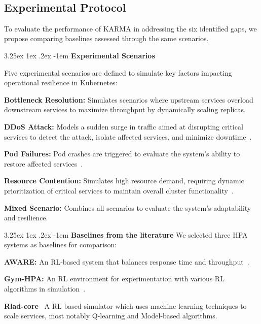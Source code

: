 \documentclass[conference]{IEEEtran}
\makeatletter
\renewcommand\paragraph{\@startsection{paragraph}{5}{\z@}%
  {3.25ex \@plus1ex \@minus.2ex}%
  {-1em}%
  {\normalfont\normalsize\bfseries}}
\makeatother
\begin{document}
\

\subsection{Experimental Protocol}

\noindent To evaluate the performance of KARMA in addressing the six identified gaps, we propose comparing baselines assessed through the same scenarios.

\paragraph{\textbf{Experimental Scenarios}}

\noindent Five experimental scenarios are defined to simulate key factors impacting operational resilience in Kubernetes:
%
\begin{enumerate*}[label=\textbf{\arabic*)}, itemjoin={;\quad }]
    \item \textbf{Bottleneck Resolution:} Simulates scenarios where upstream services overload downstream services to maximize throughput by dynamically scaling replicas.
    \item \textbf{DDoS Attack:} Models a sudden surge in traffic aimed at disrupting critical services to detect the attack, isolate affected services, and minimize downtime~\cite{Liu2018}.
    \item \textbf{Pod Failures:} Pod crashes are triggered to evaluate the system's ability to restore affected services~\cite{burns2016borg}.
    \item \textbf{Resource Contention:} Simulates high resource demand, requiring dynamic prioritization of critical services to maintain overall cluster functionality~\cite{Vhatkar2022}.
    \item \textbf{Mixed Scenario:} Combines all scenarios to evaluate the system's adaptability and resilience.
\end{enumerate*}

\paragraph{\textbf{Baselines from the literature}}
%
\noindent We selected three HPA systems as baselines for comparison:
\begin{enumerate*}[label=\textbf{\arabic*)}, itemjoin={;\quad }]
    \item \textbf{AWARE:} An RL-based system that balances response time and throughput~\cite{aware2023}.
    \item \textbf{Gym-HPA:} An RL environment for experimentation with various RL algorithms in simulation~\cite{gymhpa2022}.
    \item \textbf{Rlad-core}~\cite{Rossi2019} A RL-based simulator which uses machine learning techniques to scale services, most notably Q-learning and Model-based algorithms.
\end{enumerate*}
\end{document}

